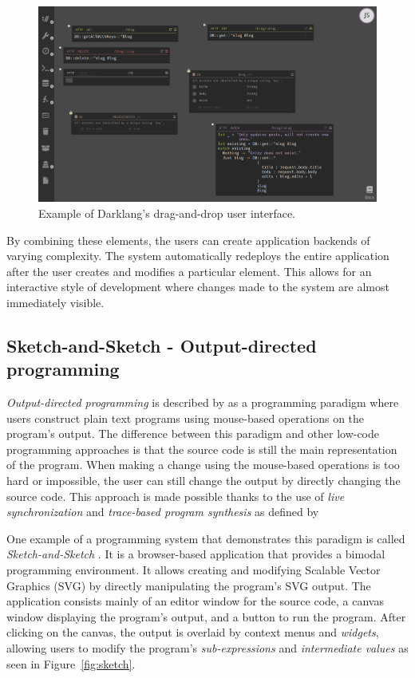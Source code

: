 \begin{figure}[htbp]
	\centering
	\includegraphics[width=1\linewidth]{img/darklang.pdf}
	\caption{Example of Darklang's drag-and-drop user interface.}
	\label{fig:darklang}
\end{figure}

By combining these elements, the users can create application backends of varying complexity.
The system automatically redeploys the entire application after the user creates and modifies a particular element.
This allows for an interactive style of development where changes made to the system are almost immediately visible.

\subsection{Sketch-and-Sketch - Output-directed programming}
\label{sec:odp}
\emph{Output-directed programming} is described by \citet{sketch-and-sketch} as
a programming paradigm where users construct plain text programs using mouse-based operations on the program's output.
The difference between this paradigm and other low-code programming approaches is that the source code is still the main representation of the program.
When making a change using the mouse-based operations is too hard or impossible, the user
can still change the output by directly changing the source code.
This approach is made possible thanks to the use of \emph{live synchronization} and \emph{trace-based program synthesis} as defined by \citet{output-directed-programming}

One example of a programming system that demonstrates this paradigm is called \emph{Sketch-and-Sketch} \cite{sketch-and-sketch,output-directed-programming}.
It is a browser-based application that provides a bimodal programming environment. It allows creating and modifying Scalable Vector Graphics (SVG) by directly manipulating the program's SVG output.
The application consists mainly of an editor window for the source code, a canvas window displaying the program's output, and a button to run the program.
After clicking on the canvas, the output is overlaid by context menus and \emph{widgets}, allowing users to modify the program's \emph{sub-expressions} and \emph{intermediate values} as seen in Figure~\ref{fig:sketch}.

